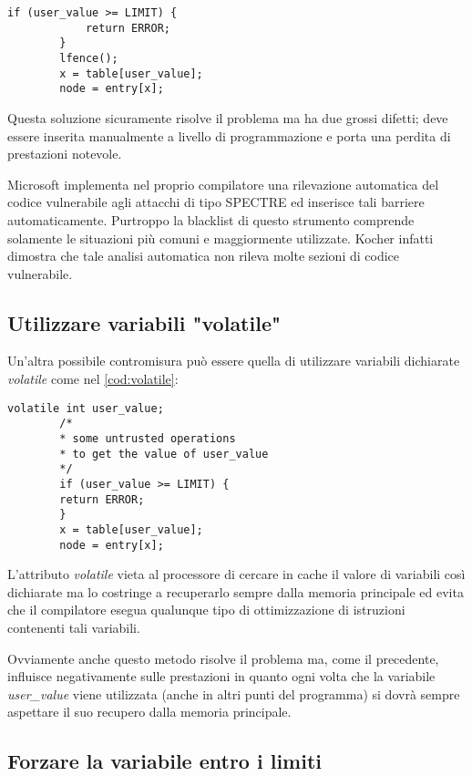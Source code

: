 		\begin{lstlisting}[caption={Utilizzo di lfence},label={list:lfence}]
		if (user_value >= LIMIT) {
			return ERROR;
		} 
		lfence(); 
		x = table[user_value]; 
		node = entry[x];
		\end{lstlisting} 
		
		Questa soluzione sicuramente risolve il problema ma ha due grossi difetti; deve essere inserita manualmente a livello di programmazione e porta una perdita di prestazioni notevole\cite{AMD2018speculation}.
		
		Microsoft implementa nel proprio compilatore una rilevazione automatica del codice vulnerabile agli attacchi di tipo SPECTRE ed inserisce tali barriere automaticamente. Purtroppo la blacklist di questo strumento comprende solamente le situazioni più comuni e maggiormente utilizzate. Kocher infatti dimostra che tale analisi automatica non rileva molte sezioni di codice vulnerabile\cite{kocher2018mitigation}.
		
		\subsection{Utilizzare variabili "volatile"}
		
		Un'altra possibile contromisura può essere quella di utilizzare variabili dichiarate \emph{volatile} come nel \cref{cod:volatile}:
		
		\begin{lstlisting}[caption={Utilizzo di variabili dichiarate volatile},label={cod:volatile}]
		volatile int user_value;
		/*
		* some untrusted operations 
		* to get the value of user_value
		*/
		if (user_value >= LIMIT) {
		return ERROR;
		} 
		x = table[user_value]; 
		node = entry[x];
		\end{lstlisting}
		
		L'attributo \emph{volatile} vieta al processore di cercare in cache il valore di variabili così dichiarate ma lo costringe a recuperarlo sempre dalla memoria principale ed evita che il compilatore esegua qualunque tipo di ottimizzazione di istruzioni contenenti tali variabili.
				
		Ovviamente anche questo metodo risolve il problema ma, come il precedente, influisce negativamente sulle prestazioni in quanto ogni volta che la variabile \emph{user\_value} viene utilizzata (anche in altri punti del programma) si dovrà sempre aspettare il suo recupero dalla memoria principale.
		
		\subsection{Forzare la variabile entro i limiti}
		
